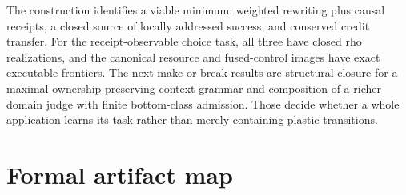 \documentclass[11pt]{article}
\begin{document}
The construction identifies a viable minimum: weighted rewriting plus causal
receipts, a closed source of locally addressed success, and conserved credit
transfer.  For the receipt-observable choice task, all three have closed rho
realizations, and the canonical resource and fused-control images have exact
executable frontiers.  The next make-or-break results are structural closure
for a maximal ownership-preserving context grammar and composition of a
richer domain judge with finite bottom-class admission.  Those decide whether
a whole application learns its task rather than merely containing plastic
transitions.

\appendix
\section{Formal artifact map}
\label{app:formal-map}
\end{document}
